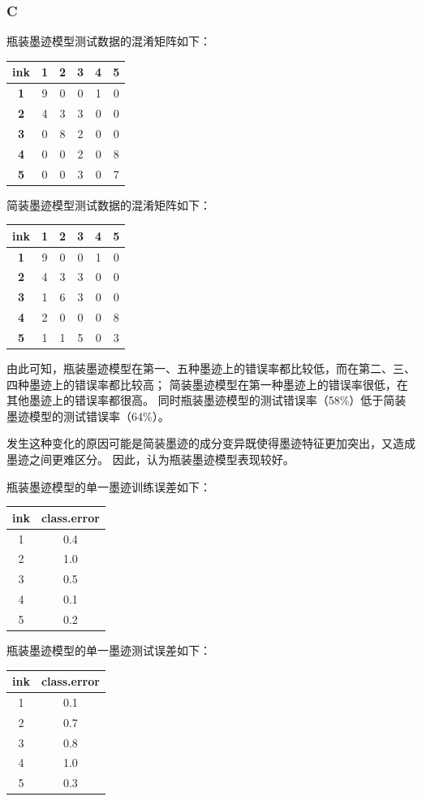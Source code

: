 \documentclass[12pt,a4paper]{article}
\begin{document}
    \subsubsection*{C}
    瓶装墨迹模型测试数据的混淆矩阵如下：
    \begin{longtable}{c|ccccc}
        \hline
        \textbf{ink} & \textbf{1} & \textbf{2} & \textbf{3} & \textbf{4} & \textbf{5}\\
        \hline
        \textbf{1} & 9 & 0 & 0 & 1 & 0\\
        \textbf{2} & 4 & 3 & 3 & 0 & 0\\
        \textbf{3} & 0 & 8 & 2 & 0 & 0\\
        \textbf{4} & 0 & 0 & 2 & 0 & 8\\
        \textbf{5} & 0 & 0 & 3 & 0 & 7\\
        \hline
    \end{longtable}
    简装墨迹模型测试数据的混淆矩阵如下：
    \begin{longtable}{c|ccccc}
        \hline
        \textbf{ink} & \textbf{1} & \textbf{2} & \textbf{3} & \textbf{4} & \textbf{5}\\
        \hline
        \textbf{1} & 9 & 0 & 0 & 1 & 0\\
        \textbf{2} & 4 & 3 & 3 & 0 & 0\\
        \textbf{3} & 1 & 6 & 3 & 0 & 0\\
        \textbf{4} & 2 & 0 & 0 & 0 & 8\\
        \textbf{5} & 1 & 1 & 5 & 0 & 3\\
        \hline
    \end{longtable}
    由此可知，瓶装墨迹模型在第一、五种墨迹上的错误率都比较低，而在第二、三、四种墨迹上的错误率都比较高；
    简装墨迹模型在第一种墨迹上的错误率很低，在其他墨迹上的错误率都很高。
    同时瓶装墨迹模型的测试错误率（58\%）低于简装墨迹模型的测试错误率（64\%）。\par
    发生这种变化的原因可能是简装墨迹的成分变异既使得墨迹特征更加突出，又造成墨迹之间更难区分。
    因此，认为瓶装墨迹模型表现较好。\par
    瓶装墨迹模型的单一墨迹训练误差如下：
    \begin{longtable}{c|c}
        \hline
        \textbf{ink} & \textbf{class.error}\\
        \hline
        1 & 0.4\\
        2 & 1.0\\
        3 & 0.5\\
        4 & 0.1\\
        5 & 0.2\\
        \hline
    \end{longtable}
    瓶装墨迹模型的单一墨迹测试误差如下：
    \begin{longtable}{c|c}
        \hline
        \textbf{ink} & \textbf{class.error}\\
        \hline
        1 & 0.1\\
        2 & 0.7\\
        3 & 0.8\\
        4 & 1.0\\
        5 & 0.3\\
        \hline
    \end{longtable}
\end{document}
